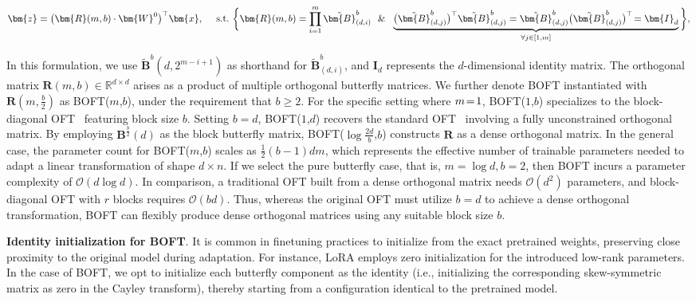 \begin{equation}
    \begin{aligned}\nonumber
    \bm{z}=\big(\bm{R}(m,b)\cdot\bm{W}^0\big)^\top\bm{x},~~~~\text{s.t.}~\bigg{\{}\bm{R}(m,b)=\prod_{i=1}^m \tilde{\bm{B}}^b_{(d,i)}~~\&~~\underbrace{\big(\tilde{\bm{B}}^b_{(d,j)}\big)^\top\tilde{\bm{B}}^b_{(d,j)}=\tilde{\bm{B}}^b_{(d,j)}\big(\tilde{\bm{B}}^b_{(d,j)}\big)^\top\!=\bm{I}_d}_{\forall j\in [1, m]}\bigg{\}},
    \end{aligned}
\end{equation}

In this formulation, we use $\tilde{\bm{B}}^b(d,2^{m - i+1})$ as shorthand for $\tilde{\bm{B}}^b_{(d,i)}$, and $\bm{I}_d$ represents the $d$-dimensional identity matrix. The orthogonal matrix $\bm{R}(m,b)\in\mathbb{R}^{d\times d}$ arises as a product of multiple orthogonal butterfly matrices. We further denote BOFT instantiated with $\bm{R}(m,\frac{b}{2})$ as BOFT($m$,$b$), under the requirement that $b\geq 2$. For the specific setting where $\thickmuskip=2mu \medmuskip=2mu m=1$, BOFT($1$,$b$) specializes to the block-diagonal OFT~\cite{qiu2023controlling} featuring block size $b$. Setting $b=d$, BOFT($1$,$d$) recovers the standard OFT~\cite{qiu2023controlling} involving a fully unconstrained orthogonal matrix. By employing $\bm{B}^{\frac{b}{2}}(d)$ as the block butterfly matrix, BOFT($\log \frac{2d}{b}$,$b$) constructs $\bm{R}$ as a dense orthogonal matrix. In the general case, the parameter count for BOFT($m$,$b$) scales as $\frac{1}{2}(b-1)dm$, which represents the effective number of trainable parameters needed to adapt a linear transformation of shape $d\times n$. If we select the pure butterfly case, that is, $m=\log d, b=2$, then BOFT incurs a parameter complexity of $\mathcal{O}(d\log d)$. In comparison, a traditional OFT built from a dense orthogonal matrix needs $\mathcal{O}(d^2)$ parameters, and block-diagonal OFT with $r$ blocks requires $\mathcal{O}(bd)$. Thus, whereas the original OFT must utilize $b=d$ to achieve a dense orthogonal transformation, BOFT can flexibly produce dense orthogonal matrices using any suitable block size $b$.

\textbf{Identity initialization for BOFT}. It is common in finetuning practices to initialize from the exact pretrained weights, preserving close proximity to the original model during adaptation. For instance, LoRA employs zero initialization for the introduced low-rank parameters. In the case of BOFT, we opt to initialize each butterfly component as the identity (i.e., initializing the corresponding skew-symmetric matrix as zero in the Cayley transform), thereby starting from a configuration identical to the pretrained model.


